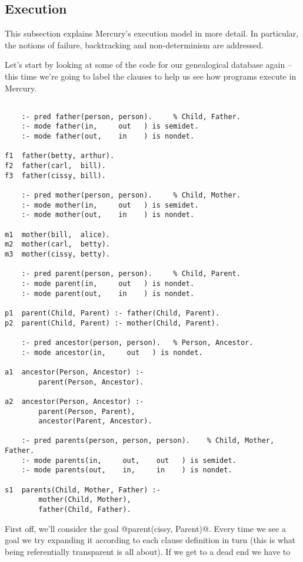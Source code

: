 \documentclass[a4paper,11pt,notitlepage,onecolumn]{article}
\begin{document}
\subsection{Execution}
This subsection explains Mercury's execution model in more
detail.  In particular, the notions of failure, backtracking
and non-determinism are addressed.

Let's start by looking at some of the code for our
genealogical database again -- this time we're going to label
the clauses to help us see how programs execute in Mercury.
\begin{verbatim}

    :- pred father(person, person).     % Child, Father.
    :- mode father(in,     out   ) is semidet.
    :- mode father(out,    in    ) is nondet.

f1  father(betty, arthur).
f2  father(carl,  bill).
f3  father(cissy, bill).

    :- pred mother(person, person).     % Child, Mother.
    :- mode mother(in,     out   ) is semidet.
    :- mode mother(out,    in    ) is nondet.

m1  mother(bill,  alice).
m2  mother(carl,  betty).
m3  mother(cissy, betty).

    :- pred parent(person, person).     % Child, Parent.
    :- mode parent(in,     out   ) is nondet.
    :- mode parent(out,    in    ) is nondet.

p1  parent(Child, Parent) :- father(Child, Parent).
p2  parent(Child, Parent) :- mother(Child, Parent).

    :- pred ancestor(person, person).   % Person, Ancestor.
    :- mode ancestor(in,     out   ) is nondet.

a1  ancestor(Person, Ancestor) :-
        parent(Person, Ancestor).

a2  ancestor(Person, Ancestor) :-
        parent(Person, Parent),
        ancestor(Parent, Ancestor).

    :- pred parents(person, person, person).    % Child, Mother, Father.
    :- mode parents(in,     out,    out   ) is semidet.
    :- mode parents(out,    in,     in    ) is nondet.

s1  parents(Child, Mother, Father) :-
        mother(Child, Mother),
        father(Child, Father).
\end{verbatim}
First off, we'll consider the goal @parent(cissy, Parent)@.
Every time we see a goal we try expanding it according to each
clause definition in turn (this is what being referentially
transparent is all about).  If we get to a dead end we have to
\end{document}
